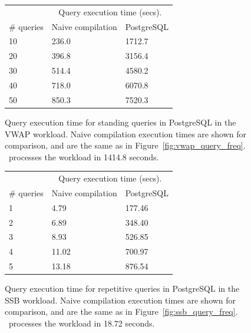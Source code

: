 \begin{figure}[htb]
\begin{center}
\begin{tabular}{|l|l|l|}
\hline
& \multicolumn{2}{c|}{Query execution time (secs).} \\
\# queries & Naive compilation & PostgreSQL \\
\hline
10 & 236.0 & 1712.7 \\
20 & 396.8 & 3156.4 \\
30 & 514.4 & 4580.2 \\
40 & 718.0 & 6070.8 \\
50 & 850.3 & 7520.3 \\
\hline 
\end{tabular}
\end{center}
\vspace{-4mm}
\caption{Query execution time for standing queries in PostgreSQL in the VWAP
workload. Naive compilation execution times are shown for comparison, and are
the same as in Figure~\ref{fig:vwap_query_freq}. \compiler\ processes the
workload in 1414.8 seconds.}
\label{tab:ssb_query_freq}
\end{figure}

\begin{figure}[htb]
\begin{center}
\begin{tabular}{|l|l|l|}
\hline
& \multicolumn{2}{c|}{Query execution time (secs).} \\
\# queries & Naive compilation & PostgreSQL \\
\hline
1 & 4.79 & 177.46 \\
2 & 6.89 & 348.40 \\
3 & 8.93 & 526.85 \\
4 & 11.02 & 700.97 \\
5 & 13.18 & 876.54 \\
\hline 
\end{tabular}
\end{center}
\vspace{-4mm}
\caption{Query execution time for repetitive queries in PostgreSQL
in the SSB workload. Naive compilation execution times are shown for comparison, and are
the same as in Figure~\ref{fig:ssb_query_freq}. \compiler\ processes the
workload in 18.72 seconds.}
\label{tab:ssb_query_freq}
\end{figure}


